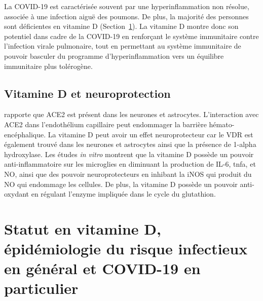 \documentclass[
  a4paper,
  DIV=11,
  numbers=noendperiod,
  listof=totoc]{scrreprt}
\begin{document}
La \ac{COVID-19} est caractérisée souvent par une hyperinflammation non
résolue, associée à une infection aiguë des poumons. De plus, la
majorité des personnes sont déficientes en vitamine D
(Section~\ref{sec-statut-vd}). La vitamine D montre donc son potentiel
dans cadre de la \ac{COVID-19} en renforçant le système immunitaire
contre l'infection virale pulmonaire, tout en permettant au système
immunitaire de pouvoir basculer du programme d'hyperinflammation vers un
équilibre immunitaire plus tolérogène.

\subsection{Vitamine D et
neuroprotection}\label{vitamine-d-et-neuroprotection}

\textcite{Shiravi.2022} rapporte que ACE2 est présent dans les neurones
et astrocytes. L'interaction avec ACE2 dans l'endothélium capillaire
peut endommager la barrière hémato-encéphalique. La vitamine D peut
avoir un effet neuroprotecteur car le VDR est également trouvé dans les
neurones et astrocytes ainsi que la présence de 1-alpha hydroxylase. Les
études \emph{in vitro} montrent que la vitamine D possède un pouvoir
anti-inflammatoire sur les microglies en diminuant la production de
IL-6, \ac{tnfa}, et NO, ainsi que des pouvoir neuroprotecteurs en
inhibant la iNOS qui produit du NO qui endommage les cellules. De plus,
la vitamine D possède un pouvoir anti-oxydant en régulant l'enzyme
impliquée dans le cycle du glutathion.

\section{Statut en vitamine D, épidémiologie du risque infectieux en
général et COVID-19 en particulier}\label{sec-statut-vd}
\end{document}
